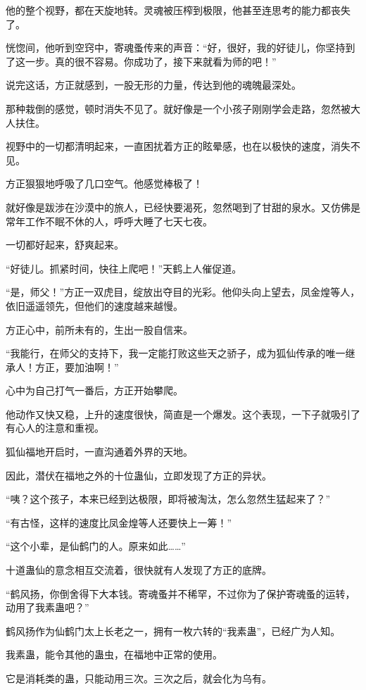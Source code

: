 \begin{this_body}
他的整个视野，都在天旋地转。灵魂被压榨到极限，他甚至连思考的能力都丧失了。

恍惚间，他听到空窍中，寄魂蚤传来的声音：“好，很好，我的好徒儿，你坚持到了这一步。真的很不容易。你成功了，接下来就看为师的吧！”

说完这话，方正就感到，一股无形的力量，传达到他的魂魄最深处。

那种栽倒的感觉，顿时消失不见了。就好像是一个小孩子刚刚学会走路，忽然被大人扶住。

视野中的一切都清明起来，一直困扰着方正的眩晕感，也在以极快的速度，消失不见。

方正狠狠地呼吸了几口空气。他感觉棒极了！

就好像是跋涉在沙漠中的旅人，已经快要渴死，忽然喝到了甘甜的泉水。又仿佛是常年工作不眠不休的人，呼呼大睡了七天七夜。

一切都好起来，舒爽起来。

“好徒儿。抓紧时间，快往上爬吧！”天鹤上人催促道。

“是，师父！”方正一双虎目，绽放出夺目的光彩。他仰头向上望去，凤金煌等人，依旧遥遥领先，但他们的速度越来越慢。

方正心中，前所未有的，生出一股自信来。

“我能行，在师父的支持下，我一定能打败这些天之骄子，成为狐仙传承的唯一继承人！方正，要加油啊！”

心中为自己打气一番后，方正开始攀爬。

他动作又快又稳，上升的速度很快，简直是一个爆发。这个表现，一下子就吸引了有心人的注意和重视。

狐仙福地开启时，一直沟通着外界的天地。

因此，潜伏在福地之外的十位蛊仙，立即发现了方正的异状。

“咦？这个孩子，本来已经到达极限，即将被淘汰，怎么忽然生猛起来了？”

“有古怪，这样的速度比凤金煌等人还要快上一筹！”

“这个小辈，是仙鹤门的人。原来如此……”

十道蛊仙的意念相互交流着，很快就有人发现了方正的底牌。

“鹤风扬，你倒舍得下大本钱。寄魂蚤并不稀罕，不过你为了保护寄魂蚤的运转，动用了我素蛊吧？”

鹤风扬作为仙鹤门太上长老之一，拥有一枚六转的“我素蛊”，已经广为人知。

我素蛊，能令其他的蛊虫，在福地中正常的使用。

它是消耗类的蛊，只能动用三次。三次之后，就会化为乌有。


\end{this_body}
